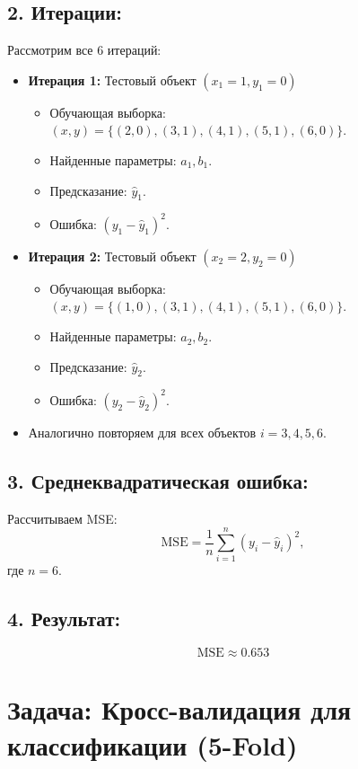 \subsection*{2. Итерации:}
Рассмотрим все 6 итераций:
\begin{itemize}
    \item \textbf{Итерация 1:} Тестовый объект \( (x_1 = 1, y_1 = 0) \)
          \begin{itemize}
              \item Обучающая выборка: \( (x, y) = \{(2, 0), (3, 1), (4, 1), (5, 1), (6, 0)\} \).
              \item Найденные параметры: \( a_1, b_1 \).
              \item Предсказание: \( \hat{y}_1 \).
              \item Ошибка: \( (y_1 - \hat{y}_1)^2 \).
          \end{itemize}
    \item \textbf{Итерация 2:} Тестовый объект \( (x_2 = 2, y_2 = 0) \)
          \begin{itemize}
              \item Обучающая выборка: \( (x, y) = \{(1, 0), (3, 1), (4, 1), (5, 1), (6, 0)\} \).
              \item Найденные параметры: \( a_2, b_2 \).
              \item Предсказание: \( \hat{y}_2 \).
              \item Ошибка: \( (y_2 - \hat{y}_2)^2 \).
          \end{itemize}
    \item Аналогично повторяем для всех объектов \( i = 3, 4, 5, 6 \).
\end{itemize}

\subsection*{3. Среднеквадратическая ошибка:}
Рассчитываем MSE:
\[
    \text{MSE} = \frac{1}{n} \sum_{i=1}^n (y_i - \hat{y}_i)^2,
\]
где \( n = 6 \).

\subsection*{4. Результат:}
\[
    \text{MSE} \approx 0.653
\]

\section*{Задача: Кросс-валидация для классификации (5-Fold)}


